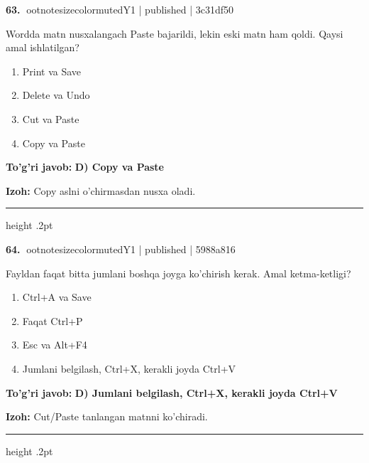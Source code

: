 \documentclass[10pt,a4paper]{article}
\begin{document}
\textbf{\color{ink}63.} {ootnotesizecolor{muted}Y1 | published | 3c31df50}
\par
Wordda matn nusxalangach Paste bajarildi, lekin eski matn ham qoldi. Qaysi amal ishlatilgan?
\begin{enumerate}[label=\Alph*),leftmargin=9mm]
\item Print va Save
\item Delete va Undo
\item Cut va Paste
\item Copy va Paste
\end{enumerate}
\begin{tcolorbox}[enhanced,breakable,colback=teal!4,colframe=teal!55!black,boxrule=0.45pt,arc=1.2mm,left=2.8mm,right=2.8mm,top=2mm,bottom=2mm]
\textbf{\color{teal}To'g'ri javob:} \textbf{D) Copy va Paste}
\par\smallskip
\textbf{Izoh:} Copy aslni o'chirmasdan nusxa oladi.
\end{tcolorbox}
\vspace{2mm}\hrule height .2pt\vspace{2mm}

\textbf{\color{ink}64.} {ootnotesizecolor{muted}Y1 | published | 5988a816}
\par
Fayldan faqat bitta jumlani boshqa joyga ko'chirish kerak. Amal ketma-ketligi?
\begin{enumerate}[label=\Alph*),leftmargin=9mm]
\item Ctrl+A va Save
\item Faqat Ctrl+P
\item Esc va Alt+F4
\item Jumlani belgilash, Ctrl+X, kerakli joyda Ctrl+V
\end{enumerate}
\begin{tcolorbox}[enhanced,breakable,colback=teal!4,colframe=teal!55!black,boxrule=0.45pt,arc=1.2mm,left=2.8mm,right=2.8mm,top=2mm,bottom=2mm]
\textbf{\color{teal}To'g'ri javob:} \textbf{D) Jumlani belgilash, Ctrl+X, kerakli joyda Ctrl+V}
\par\smallskip
\textbf{Izoh:} Cut/Paste tanlangan matnni ko'chiradi.
\end{tcolorbox}
\vspace{2mm}\hrule height .2pt\vspace{2mm}
\end{document}
